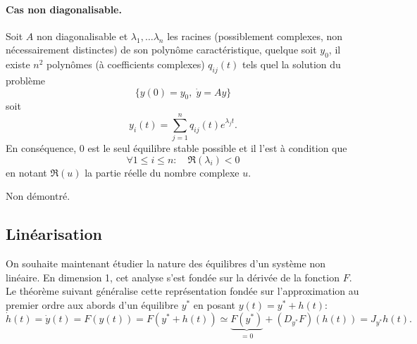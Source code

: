 \paragraph*{Cas non diagonalisable.}

\begin{theorem}
  Soit $A$ non diagonalisable et $\lambda_1, \dots \lambda_n$ les racines (possiblement complexes, non nécessairement distinctes) de son polynôme caractéristique, quelque soit $y_0$, il existe $n^2$ polynômes (à coefficients complexes) $q_{ij}(t)$ tels quel la solution du problème
  $$
  \{y(0) = y_0, \; \dot y = A y\}
  $$
  soit
  $$
  y_i(t) = \sum_{j=1}^n q_{ij}(t) e^{\lambda_j t}.
  $$
  En conséquence, 0 est le seul équilibre stable possible et il l'est à condition que
  $$
  \forall 1 \leq i \leq n: \quad \Re(\lambda_i) < 0
  $$
  en notant $\Re(u)$ la partie réelle du nombre complexe $u$.
\end{theorem}

\proof Non démontré. \eproof


\subsection{Linéarisation} 

On souhaite maintenant étudier la nature des équilibres d'un système non linéaire. En dimension 1, cet analyse s'est fondée sur la dérivée de la fonction $F$. Le théorème suivant généralise cette représentation fondée sur l'approximation au premier ordre aux abords d'un équilibre $y^*$ en posant $y(t) = y^* + h(t)$: 
$$
\dot h(t) = \dot y (t) = F(y(t)) = F(y^* + h(t)) 
\simeq \underset{=0}{\underbrace{F(y^*)}} + (D_{y^*} F)(h(t)) = J_{y^*} h(t).
$$

